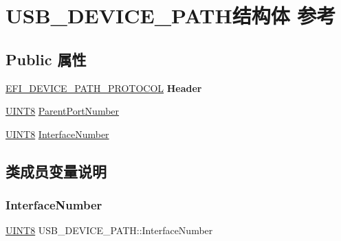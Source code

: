\hypertarget{struct_u_s_b___d_e_v_i_c_e___p_a_t_h}{}\section{U\+S\+B\+\_\+\+D\+E\+V\+I\+C\+E\+\_\+\+P\+A\+T\+H结构体 参考}
\label{struct_u_s_b___d_e_v_i_c_e___p_a_t_h}
\subsection*{Public 属性}
\begin{DoxyCompactItemize}
\item 
\mbox{\label{struct_u_s_b___d_e_v_i_c_e___p_a_t_h_adee6c6c8597288b3d1dceb410b2b1050}} 
\hyperlink{struct_e_f_i___d_e_v_i_c_e___p_a_t_h___p_r_o_t_o_c_o_l}{E\+F\+I\+\_\+\+D\+E\+V\+I\+C\+E\+\_\+\+P\+A\+T\+H\+\_\+\+P\+R\+O\+T\+O\+C\+OL} {\bfseries Header}
\item 
\hyperlink{_processor_bind_8h_ab27e9918b538ce9d8ca692479b375b6a}{U\+I\+N\+T8} \hyperlink{struct_u_s_b___d_e_v_i_c_e___p_a_t_h_a12abab139520e2caae8357b7b2dbb364}{Parent\+Port\+Number}
\item 
\hyperlink{_processor_bind_8h_ab27e9918b538ce9d8ca692479b375b6a}{U\+I\+N\+T8} \hyperlink{struct_u_s_b___d_e_v_i_c_e___p_a_t_h_a078524f5a2d61d35e6f9b4d0d308bebe}{Interface\+Number}
\end{DoxyCompactItemize}


\subsection{类成员变量说明}
\mbox{\label{struct_u_s_b___d_e_v_i_c_e___p_a_t_h_a078524f5a2d61d35e6f9b4d0d308bebe}} 
\subsubsection{\texorpdfstring{Interface\+Number}{InterfaceNumber}}
{\footnotesize\ttfamily \hyperlink{_processor_bind_8h_ab27e9918b538ce9d8ca692479b375b6a}{U\+I\+N\+T8} U\+S\+B\+\_\+\+D\+E\+V\+I\+C\+E\+\_\+\+P\+A\+T\+H\+::\+Interface\+Number}

